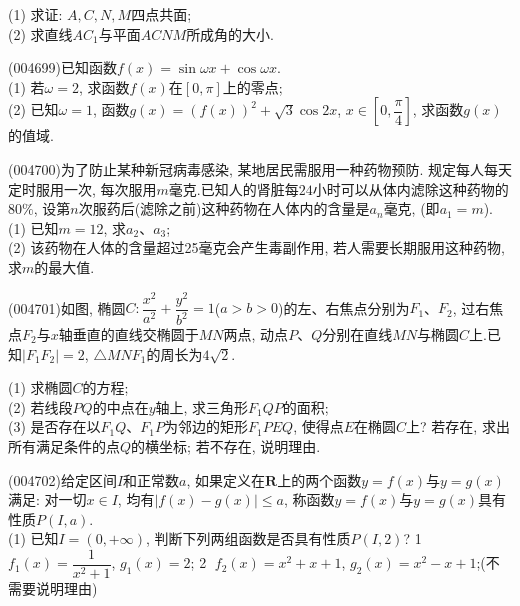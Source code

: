 (1) 求证: $A,C,N,M$四点共面;\\
(2) 求直线$AC_1$与平面$ACNM$所成角的大小.
\item (004699)已知函数$f(x)=\sin \omega x+\cos \omega x$.\\
(1) 若$\omega =2$, 求函数$f(x)$在$[0,\pi]$上的零点;\\
(2) 已知$\omega =1$, 函数$g(x)=(f(x))^2+\sqrt 3\cos 2x$, $x\in [0,\dfrac{\pi}4]$, 求函数$g(x)$的值域.
\item (004700)为了防止某种新冠病毒感染, 某地居民需服用一种药物预防. 规定每人每天定时服用一次, 每次服用$m$毫克.已知人的肾脏每$24$小时可以从体内滤除这种药物的$80\%$, 设第$n$次服药后(滤除之前)这种药物在人体内的含量是$a_n$毫克, (即$a_1=m$).\\
(1)	已知$m=12$, 求$a_2$、$a_3$;\\
(2)	该药物在人体的含量超过25毫克会产生毒副作用, 若人需要长期服用这种药物, 求$m$的最大值.
\item (004701)如图, 椭圆$C:\dfrac{x^2}{a^2}+\dfrac{y^2}{b^2}=1$($a>b>0$)的左、右焦点分别为$F_1$、$F_2$, 过右焦点$F_2$与$x$轴垂直的直线交椭圆于$MN$两点, 动点$P$、$Q$分别在直线$MN$与椭圆$C$上.已知$|F_1F_2|=2$, $\triangle MNF_1$的周长为$4\sqrt 2$.\\
\begin{center}
\end{center}
(1)	求椭圆$C$的方程;\\
(2)	若线段$PQ$的中点在$y$轴上, 求三角形$F_1QP$的面积;\\
(3)	是否存在以$F_1Q$、$F_1P$为邻边的矩形$F_1PEQ$, 使得点$E$在椭圆$C$上? 若存在, 求出所有满足条件的点$Q$的横坐标; 若不存在, 说明理由.
\item (004702)给定区间$I$和正常数$a$, 如果定义在$\mathbf{R}$上的两个函数$y=f(x)$与$y=g(x)$满足: 对一切$x\in I$, 均有$|f(x)-g(x)|\le a$, 称函数$y=f(x)$与$y=g(x)$具有性质$P(I,a)$.\\
(1)	已知$I=(0,+\infty)$, 判断下列两组函数是否具有性质$P(I,2)$? \textcircled{1} $f_1(x)=\dfrac 1{{x^2}+1}$, $g_1(x)=2$; \textcircled{2} $f_2(x)=x^2+x+1$, $g_2(x)=x^2-x+1$;(不需要说明理由)\\
